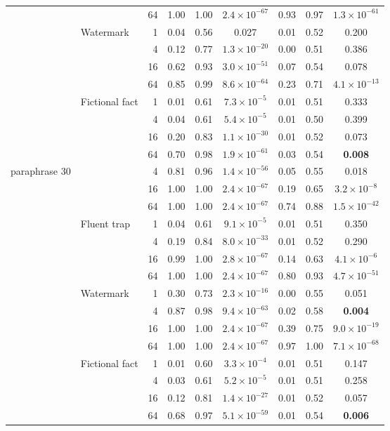 \begin{tabular}{llrcccccc}
 &  & 64 & 1.00 & 1.00 & \textbf{$2.4{\times}10^{-67}$} & 0.93 & 0.97 & \textbf{$1.3{\times}10^{-61}$} \\
 & Watermark & 1 & 0.04 & 0.56 & 0.027 & 0.01 & 0.52 & 0.200 \\
 &  & 4 & 0.12 & 0.77 & \textbf{$1.3{\times}10^{-20}$} & 0.00 & 0.51 & 0.386 \\
 &  & 16 & 0.62 & 0.93 & \textbf{$3.0{\times}10^{-51}$} & 0.07 & 0.54 & 0.078 \\
 &  & 64 & 0.85 & 0.99 & \textbf{$8.6{\times}10^{-64}$} & 0.23 & 0.71 & \textbf{$4.1{\times}10^{-13}$} \\
 & Fictional fact & 1 & 0.01 & 0.61 & \textbf{$7.3{\times}10^{-5}$} & 0.01 & 0.51 & 0.333 \\
 &  & 4 & 0.04 & 0.61 & \textbf{$5.4{\times}10^{-5}$} & 0.01 & 0.50 & 0.399 \\
 &  & 16 & 0.20 & 0.83 & \textbf{$1.1{\times}10^{-30}$} & 0.01 & 0.52 & 0.073 \\
 &  & 64 & 0.70 & 0.98 & \textbf{$1.9{\times}10^{-61}$} & 0.03 & 0.54 & \textbf{0.008} \\
\midrule
paraphrase 30%
 &  & 4 & 0.81 & 0.96 & \textbf{$1.4{\times}10^{-56}$} & 0.05 & 0.55 & 0.018 \\
 &  & 16 & 1.00 & 1.00 & \textbf{$2.4{\times}10^{-67}$} & 0.19 & 0.65 & \textbf{$3.2{\times}10^{-8}$} \\
 &  & 64 & 1.00 & 1.00 & \textbf{$2.4{\times}10^{-67}$} & 0.74 & 0.88 & \textbf{$1.5{\times}10^{-42}$} \\
 & Fluent trap & 1 & 0.04 & 0.61 & \textbf{$9.1{\times}10^{-5}$} & 0.01 & 0.51 & 0.350 \\
 &  & 4 & 0.19 & 0.84 & \textbf{$8.0{\times}10^{-33}$} & 0.01 & 0.52 & 0.290 \\
 &  & 16 & 0.99 & 1.00 & \textbf{$2.8{\times}10^{-67}$} & 0.14 & 0.63 & \textbf{$4.1{\times}10^{-6}$} \\
 &  & 64 & 1.00 & 1.00 & \textbf{$2.4{\times}10^{-67}$} & 0.80 & 0.93 & \textbf{$4.7{\times}10^{-51}$} \\
 & Watermark & 1 & 0.30 & 0.73 & \textbf{$2.3{\times}10^{-16}$} & 0.00 & 0.55 & 0.051 \\
 &  & 4 & 0.87 & 0.98 & \textbf{$9.4{\times}10^{-63}$} & 0.02 & 0.58 & \textbf{0.004} \\
 &  & 16 & 1.00 & 1.00 & \textbf{$2.4{\times}10^{-67}$} & 0.39 & 0.75 & \textbf{$9.0{\times}10^{-19}$} \\
 &  & 64 & 1.00 & 1.00 & \textbf{$2.4{\times}10^{-67}$} & 0.97 & 1.00 & \textbf{$7.1{\times}10^{-68}$} \\
 & Fictional fact & 1 & 0.01 & 0.60 & \textbf{$3.3{\times}10^{-4}$} & 0.01 & 0.51 & 0.147 \\
 &  & 4 & 0.03 & 0.61 & \textbf{$5.2{\times}10^{-5}$} & 0.01 & 0.51 & 0.258 \\
 &  & 16 & 0.12 & 0.81 & \textbf{$1.4{\times}10^{-27}$} & 0.01 & 0.52 & 0.057 \\
 &  & 64 & 0.68 & 0.97 & \textbf{$5.1{\times}10^{-59}$} & 0.01 & 0.54 & \textbf{0.006} \\
\bottomrule
\end{tabular}
